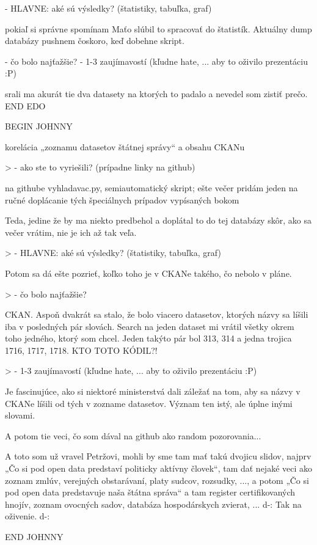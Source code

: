 \documentclass[12pt,a4paper]{article}
\begin{document}
  - HLAVNE: aké sú výsledky? (štatistiky, tabuľka, graf) 

pokiaľ si správne spomínam Maťo slúbil to spracovať do štatistík. 
Aktuálny dump databázy pushnem čoskoro, keď dobehne skript.


  - čo bolo najťažšie? 
  - 1-3 zaujímavostí (kľudne hate, ... aby to oživilo prezentáciu :P)

srali ma akurát tie dva datasety na ktorých to padalo a nevedel som zistiť prečo.
END EDO 

BEGIN JOHNNY

korelácia „zoznamu datasetov štátnej správy“ a obsahu CKANu

>   - ako ste to vyriešili? (prípadne linky na github)

na githube vyhladavac.py, semiautomatický skript; ešte večer pridám
jeden na ručné doplácanie tých špeciálnych prípadov vypísaných bokom

Teda, jedine že by ma niekto predbehol a doplátal to do tej databázy
skôr, ako sa večer vrátim, nie je ich až tak veľa.

>   - HLAVNE: aké sú výsledky? (štatistiky, tabuľka, graf)

Potom sa dá ešte pozrieť, koľko toho je v CKANe takého, čo nebolo
v pláne.

>   - čo bolo najťažšie?

CKAN. Aspoň dvakrát sa stalo, že bolo viacero datasetov, ktorých názvy
sa líšili iba v posledných pár slovách. Search na jeden dataset mi
vrátil všetky okrem toho jedného, ktorý som chcel. Jeden takýto pár
bol 313, 314 a jedna trojica 1716, 1717, 1718. KTO TOTO KÓDIL?!

>   - 1-3 zaujímavostí (kľudne hate, ... aby to oživilo prezentáciu :P)

Je fascinujúce, ako si niektoré ministerstvá dali záležať na tom, aby
sa názvy v CKANe líšili od tých v zozname datasetov. Význam ten istý,
ale úplne inými slovami.

A potom tie veci, čo som dával na github ako random pozorovania...

A toto som už vravel Petržovi, mohli by sme tam mať takú dvojicu
slidov, najprv „Čo si pod open data predstaví politicky aktívny
človek“, tam dať nejaké veci ako zoznam zmlúv, verejných obstarávaní,
platy sudcov, rozsudky, ..., a potom „Čo si pod open data predstavuje
naša štátna správa“ a tam register certifikovaných hnojív, zoznam
ovocných sadov, databáza hospodárskych zvierat, ... d-: Tak na
oživenie. d-:

END JOHNNY 
\end{document}

